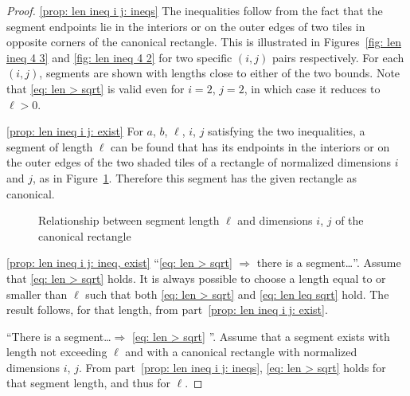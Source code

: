 \documentclass[12pt, a4paper]{article}
\newcommand{\len}{\ell} %
\begin{document}
\begin{proof}
\ref*{prop: len ineq i j: ineqs} The inequalities follow from the fact that the segment endpoints lie in the interiors or on the outer edges of two tiles in opposite corners of the canonical rectangle. This is illustrated in Figures~\ref{fig: len ineq 4 3} and \ref{fig: len ineq 4 2} for two specific $(i,j)$ pairs respectively. For each $(i,j)$, segments are shown with lengths close to either of the two bounds. Note that \eqref{eq: len > sqrt} is valid even for $i=2$, $j=2$, in which case it reduces to $\len>0$.

\ref*{prop: len ineq i j: exist} For $a$, $b$, $\len$, $i$, $j$ satisfying the two inequalities, a segment of length $\len$ can be found that has its endpoints in the interiors or on the outer edges of the two shaded tiles of a rectangle of normalized dimensions $i$ and $j$, as in Figure~\ref{fig: len ineq i j}. Therefore this segment has the given rectangle as canonical.
\begin{figure}
\centering%
\hfill%
%
\caption{Relationship between segment length $\len$ and dimensions $i$, $j$ of the canonical rectangle
}%
\label{fig: len ineq i j}
\end{figure}%

\ref*{prop: len ineq i j: ineq, exist} ``\eqref{eq: len > sqrt} $\Rightarrow$ there is a segment\ldots''. Assume that \eqref{eq: len > sqrt} holds. It is always possible to choose a length equal to or smaller than $\len$ such that both \eqref{eq: len > sqrt} and \eqref{eq: len leq sqrt} hold. The result follows, for that length, from part~\ref{prop: len ineq i j: exist}.

``There is a segment\ldots $\Rightarrow$ \eqref{eq: len > sqrt} ''. Assume that a segment exists with length not exceeding $\len$ and with a canonical rectangle with normalized dimensions $i$, $j$. From part~\ref{prop: len ineq i j: ineqs}, \eqref{eq: len > sqrt} holds for that segment length, and thus for $\len$.
\end{proof}
\end{document}
